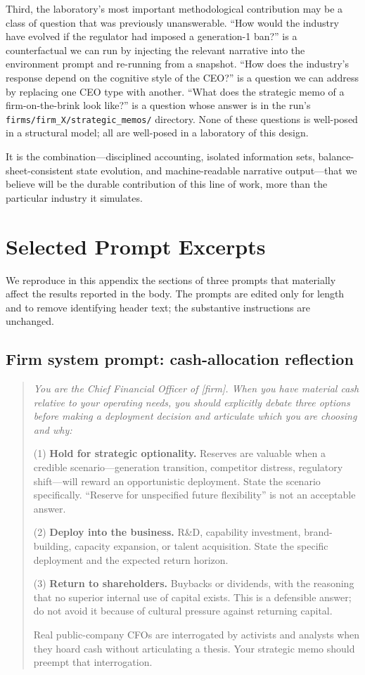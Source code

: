 \documentclass[11pt]{article}
\begin{document}
Third, the laboratory's most important methodological contribution may
be a class of question that was previously unanswerable. ``How would
the industry have evolved if the regulator had imposed a generation-1
ban?'' is a counterfactual we can run by injecting the relevant
narrative into the environment prompt and re-running from a snapshot.
``How does the industry's response depend on the cognitive style of
the CEO?'' is a question we can address by replacing one CEO type
with another. ``What does the strategic memo of a firm-on-the-brink
look like?'' is a question whose answer is in the run's
\texttt{firms/firm\_X/strategic\_memos/} directory. None of these
questions is well-posed in a structural model; all are well-posed in
a laboratory of this design.

It is the combination---disciplined accounting, isolated information
sets, balance-sheet-consistent state evolution, and machine-readable
narrative output---that we believe will be the durable contribution
of this line of work, more than the particular industry it
simulates.

\appendix
\section{Selected Prompt Excerpts}\label{app:prompts}

We reproduce in this appendix the sections of three prompts that
materially affect the results reported in the body. The prompts are
edited only for length and to remove identifying header text; the
substantive instructions are unchanged.

\subsection{Firm system prompt: cash-allocation reflection}

\begin{quote}\small\itshape
You are the Chief Financial Officer of [firm]. When you have material
cash relative to your operating needs, you should explicitly debate
three options before making a deployment decision and articulate
which you are choosing and why:

(1) \textbf{Hold for strategic optionality.} Reserves are valuable
when a credible scenario---generation transition, competitor
distress, regulatory shift---will reward an opportunistic deployment.
State the scenario specifically. ``Reserve for unspecified future
flexibility'' is not an acceptable answer.

(2) \textbf{Deploy into the business.} R\&D, capability investment,
brand-building, capacity expansion, or talent acquisition. State the
specific deployment and the expected return horizon.

(3) \textbf{Return to shareholders.} Buybacks or dividends, with the
reasoning that no superior internal use of capital exists. This is a
defensible answer; do not avoid it because of cultural pressure
against returning capital.

Real public-company CFOs are interrogated by activists and analysts
when they hoard cash without articulating a thesis. Your strategic
memo should preempt that interrogation.
\end{quote}
\end{document}
